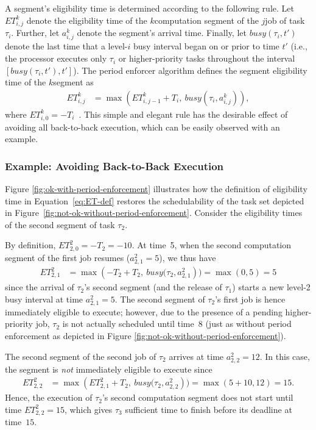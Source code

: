 A segment's eligibility time is determined according to the following rule. Let $ET_{i,j}^k$ denote the eligibility time of the $k$\xth computation segment of the $j$\xth job of task $\tau_i$. Further, let $a^k_{i,j}$ denote the segment's arrival time. Finally, let $\mathit{busy}(\tau_i, t')$ denote the last time that a level-$i$ busy interval began on or prior to time $t'$ (i.e., the processor executes only $\tau_i$ or higher-priority tasks throughout the interval $[\mathit{busy}(\tau_i, t'), t']$). The period enforcer algorithm defines the segment eligibility time of the $k$\xth segment as
\begin{align}\label{eq:ET-def}
	ET_{i,j}^k & = \max\left(ET_{i,j-1}^k + T_i,\ \mathit{busy}(\tau_i, a^k_{i,j})\right),
\end{align}
where $ET_{i,0}^k = -T_i$~\cite[Section 3.1]{Raj:suspension1991}. This simple and elegant rule has the desirable effect of avoiding all back-to-back execution, which can be easily observed with an example.

\subsubsection{Example: Avoiding Back-to-Back Execution}

Figure \ref{fig:ok-with-period-enforcement} illustrates how the definition of eligibility time in Equation~\ref{eq:ET-def} restores the schedulability of the task set depicted in Figure~\ref{fig:not-ok-without-period-enforcement}. Consider the eligibility times of the second segment of task $\tau_2$.

By definition,  $ET_{2,0}^2 = -T_2 = -10$. At time~5, when the second computation segment of the first job resumes ($a_{2,1}^2 = 5$), we thus have
\begin{align*}
	ET_{2,1}^2 & = \max\left(-T_2 + T_2,\ \mathit{busy}(\tau_2, a_{2,1}^2\right) ) = \max(0, 5) = 5
\end{align*}
since the arrival of $\tau_2$'s second segment (and the release of $\tau_1$) starts a new level-2 busy interval at time $a_{2,1}^2 = 5$. The second segment of $\tau_2$'s first job is hence immediately eligible to execute; however, due to the presence of a pending higher-priority job, $\tau_2$ is not actually scheduled until time~8 (just as without period enforcement as depicted in Figure \ref{fig:not-ok-without-period-enforcement}).

The second segment of the second job of $\tau_2$ arrives at time $a_{2,2}^2 = 12$. In this case, the segment is \emph{not} immediately eligible to execute since
\begin{align*}
	ET_{2,2}^2 & = \max\left(ET_{2,1}^2 + T_2,\ \mathit{busy}(\tau_2, a_{2,2}^2\right) ) = \max(5 + 10, 12) = 15.
\end{align*}
Hence, the execution of $\tau_2$'s second computation segment does not start until time $ET_{2,2}^2 = 15$, which gives $\tau_3$ sufficient time to finish before its deadline at time~$15$.



